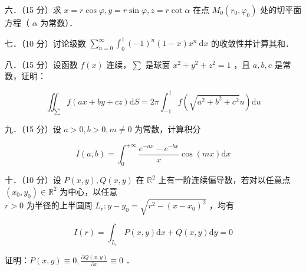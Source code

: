 \documentclass{article}
\begin{document}
六．（15 分）求 \(x=r \cos \varphi, y=r \sin \varphi, z=r \cot \alpha\) 在点 \(M_{0}\left(r_{0}, \varphi_{0}\right)\) 处的切平面方程（ \(\alpha\) 为常数）．

七．（10 分）讨论级数 \(\sum_{n=0}^{\infty} \int_{0}^{1}(-1)^{n}(1-x) x^{n} \mathrm{~d} x\) 的收敛性并计算其和．

八．（15 分）设函数 \(f(x)\) 连续，\(\sum\) 是球面 \(x^{2}+y^{2}+z^{2}=1\) ，且 \(a, b, c\) 是常数，证明：

\[
\iint_{\sum} f(a x+b y+c z) \mathrm{d} S=2 \pi \int_{-1}^{1} f\left(\sqrt{a^{2}+b^{2}+c^{2}} u\right) \mathrm{d} u
\]

九．（15 分）设 \(a>0, b>0, m \neq 0\) 为常数，计算积分

\[
I(a, b)=\int_{0}^{+\infty} \frac{e^{-a x}-e^{-b x}}{x} \cos (m x) \mathrm{d} x
\]

十．（10 分）设 \(P(x, y), Q(x, y)\) 在 \(\mathbb{R}^{2}\) 上有一阶连续偏导数，若对以任意点 \(\left(x_{0}, y_{0}\right) \in \mathbb{R}^{2}\) 为中心，以任意\\
\(r>0\) 为半径的上半圆周 \(L_{r}: y-y_{0}=\sqrt{r^{2}-\left(x-x_{0}\right)^{2}}\) ，均有

\[
I(r)=\int_{L_{r}} P(x, y) \mathrm{d} x+Q(x, y) \mathrm{d} y=0
\]

证明：\(P(x, y) \equiv 0, \frac{\partial Q(x, y)}{\partial x} \equiv 0\) ．
\end{document}
